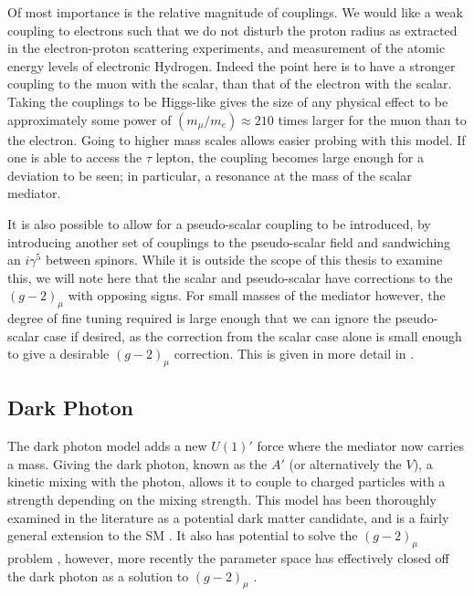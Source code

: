 Of most importance is the relative magnitude of couplings.
We would like a weak coupling to electrons such that we do not disturb the proton radius as extracted in the electron-proton scattering experiments, and measurement of the atomic energy levels of electronic Hydrogen.
Indeed the point here is to have a stronger coupling to the muon with the scalar, than that of the electron with the scalar.
Taking the couplings to be Higgs-like gives the size of any physical effect to be approximately some power of $(m_\mu/m_e) \approx 210$ times larger for the muon than to the electron.
Going to higher mass scales allows easier probing with this model.
If one is able to access the $\tau$ lepton, the coupling becomes large enough for a deviation to be seen; in particular, a resonance at the mass of the scalar mediator.

It is also possible to allow for a pseudo-scalar coupling to be introduced, by introducing another set of couplings to the pseudo-scalar field and sandwiching an $i\gamma^5$ between spinors.
While it is outside the scope of this thesis to examine this, we will note here that the scalar and pseudo-scalar have corrections to the $(g-2)_\mu$ with opposing signs.
For small masses of the mediator however, the degree of fine tuning required is large enough that we can ignore the pseudo-scalar case if desired, as the correction from the scalar case alone is small enough to give a desirable $(g-2)_\mu$ correction.
This is given in more detail in \cite{Carlson:2015jba}.

\subsection{Dark Photon}
The dark photon model adds a new $U(1)'$ force where the mediator now carries a mass.
Giving the dark photon, known as the $A'$ (or alternatively the $V$), a kinetic mixing with the photon, allows it to couple to charged particles with a strength depending on the mixing strength.
This model has been thoroughly examined in the literature as a potential dark matter candidate, and is a fairly general extension to the SM \cite{Holdom:1985ag}.
It also has potential to solve the $(g-2)_\mu$ problem \cite{Pospelov:2008zw}, however, more recently the parameter space has effectively closed off the dark photon as a solution to $(g-2)_\mu$ \cite{Batley:2015lha}.

